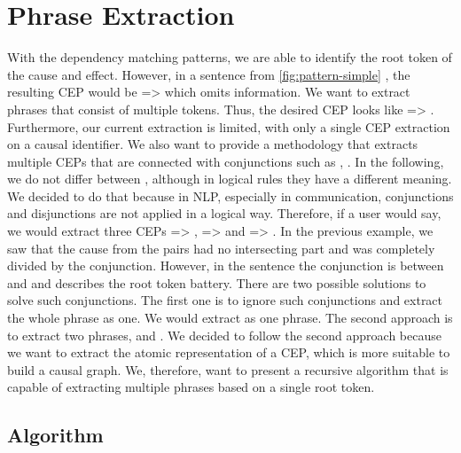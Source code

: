 \section{Phrase Extraction}\label{sec:phrase-extraction}
With the dependency matching patterns, we are able to identify the root token of the cause and effect.
However, in a sentence from \autoref{fig:pattern-simple} , the resulting \ac{CEP} would be  =>  which omits information.
We want to extract phrases that consist of multiple tokens.
Thus, the desired \ac{CEP} looks like  => .
Furthermore, our current extraction is limited, with only a single CEP extraction on a causal identifier.
We also want to provide a methodology that extracts multiple CEPs that are connected with conjunctions such as , .
In the following, we do not differ between ,  although in logical rules they have a different meaning.
We decided to do that because in NLP, especially in communication, conjunctions and disjunctions are not applied in a logical way.
Therefore, if a user would say,  we would extract three \ac{CEP}s  => ,  =>  and  => .
In the previous example, we saw that the cause from the pairs had no intersecting part and was completely divided by the conjunction.
However, in the sentence  the conjunction is between  and  and describes the root token battery.
There are two possible solutions to solve such conjunctions.
The first one is to ignore such conjunctions and extract the whole phrase as one.
We would extract  as one phrase.
The second approach is to extract two phrases,  and .
We decided to follow the second approach because we want to extract the atomic representation of a \ac{CEP}, which is more suitable to build a causal graph.
We, therefore, want to present a recursive algorithm that is capable of extracting multiple phrases based on a single root token.

\subsection{Algorithm}\label{subsec:algorithm}


